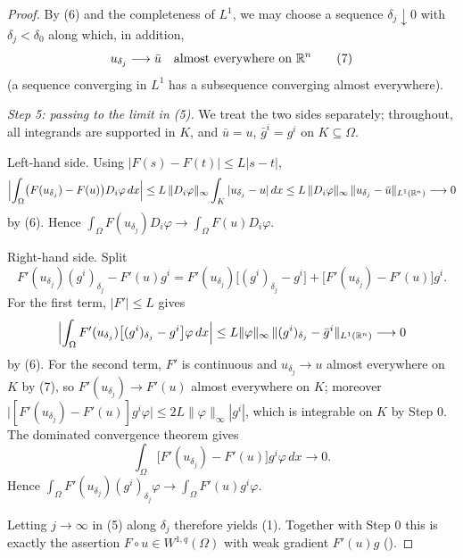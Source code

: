 \begin{proof}
By (6) and the completeness of $L^1$, we may choose a sequence
$\delta_j\downarrow0$ with $\delta_j<\delta_0$ along which, in addition,
\[
u_{\delta_j}\longrightarrow\bar u\quad\text{almost everywhere on }\mathbb{R}^n
\tag{7}
\]
(a sequence converging in $L^1$ has a subsequence converging almost
everywhere).

\emph{Step 5: passing to the limit in (5).}  We treat the two sides separately;
throughout, all integrands are supported in $K$, and $\bar u=u$,
$\bar g^i=g^i$ on $K\subseteq\Omega$.

Left-hand side.  Using $|F(s)-F(t)|\le L|s-t|$,
\[
\Bigl|\int_\Omega\bigl(F(u_{\delta_j})-F(u)\bigr)D_i\varphi\,dx\Bigr|
\le L\,\|D_i\varphi\|_\infty\int_K|u_{\delta_j}-u|\,dx
\le L\,\|D_i\varphi\|_\infty\,\|u_{\delta_j}-\bar u\|_{L^1(\mathbb{R}^n)}
\longrightarrow0
\]
by (6).  Hence $\int_\Omega F(u_{\delta_j})D_i\varphi\to\int_\Omega F(u)D_i\varphi$.

Right-hand side.  Split
\[
F'(u_{\delta_j})(g^i)_{\delta_j}-F'(u)g^i
=F'(u_{\delta_j})\bigl[(g^i)_{\delta_j}-g^i\bigr]
+\bigl[F'(u_{\delta_j})-F'(u)\bigr]g^i .
\]
For the first term, $|F'|\le L$ gives
\[
\Bigl|\int_\Omega F'(u_{\delta_j})\bigl[(g^i)_{\delta_j}-g^i\bigr]\varphi\,dx\Bigr|
\le L\|\varphi\|_\infty\,\|(g^i)_{\delta_j}-\bar g^i\|_{L^1(\mathbb{R}^n)}\longrightarrow0
\]
by (6).  For the second term, $F'$ is continuous and $u_{\delta_j}\to u$ almost
everywhere on $K$ by (7), so $F'(u_{\delta_j})\to F'(u)$ almost everywhere on
$K$; moreover
$\bigl|[F'(u_{\delta_j})-F'(u)]g^i\varphi\bigr|\le2L\|\varphi\|_\infty|g^i|$,
which is integrable on $K$ by Step 0.  The dominated convergence theorem gives
\[
\int_\Omega\bigl[F'(u_{\delta_j})-F'(u)\bigr]g^i\varphi\,dx\longrightarrow0 .
\]
Hence $\int_\Omega F'(u_{\delta_j})(g^i)_{\delta_j}\varphi\to\int_\Omega F'(u)g^i\varphi$.

Letting $j\to\infty$ in (5) along $\delta_j$ therefore yields (1).  Together with
Step 0 this is exactly the assertion
$F\circ u\in W^{1,q}(\Omega)$ with weak gradient $F'(u)g$
().
\end{proof}
